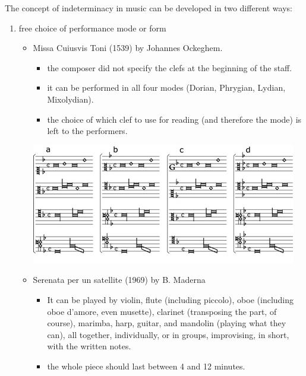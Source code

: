 The concept of indeterminacy in music can be developed in two different ways:

\begin{enumerate}
\def\labelenumi{\arabic{enumi}.}
\tightlist
\item free choice of performance mode or form

  \begin{itemize}
  \tightlist
  \item Missa Cuiusvis Toni (1539) by Johannes Ockeghem.

    \begin{itemize}
    \tightlist
    \item the composer did not specify the clefs at the beginning of the staff.
    \item it can be performed in all four modes (Dorian, Phrygian, Lydian,  Mixolydian).
    \item the choice of which clef to use for reading (and therefore the mode) is left to the performers.
    \end{itemize}
    
    \begin{center}
    \includegraphics[scale=0.4]{../img/Cuiusvis_toni.png}
    \end{center}
  \item Serenata per un satellite (1969) by B. Maderna

    \begin{itemize}
    \tightlist
    \item It can be played by violin, flute (including piccolo), oboe (including oboe d'amore, even musette), clarinet (transposing the part, of course), marimba, harp, guitar, and mandolin (playing what they can), all together, individually, or in groups, improvising, in short, with the written notes.
    \item the whole piece should last between 4 and 12 minutes.
    \end{itemize}


\end{itemize}
\end{enumerate}
